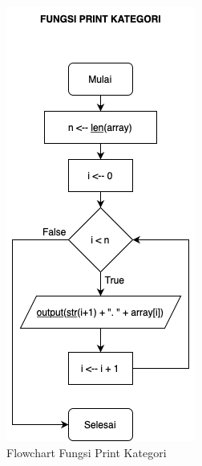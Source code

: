 \documentclass[conference]{IEEEtran}
\begin{document}
\begin{figure}[htbp]
    \centering
    \def\svgwidth{\columnwidth}
    \centerline{\includegraphics[scale=0.45]{PrintArray.png}}
    \caption{Flowchart Fungsi Print Kategori}
    \label{fig11}
\end{figure}
\end{document}
